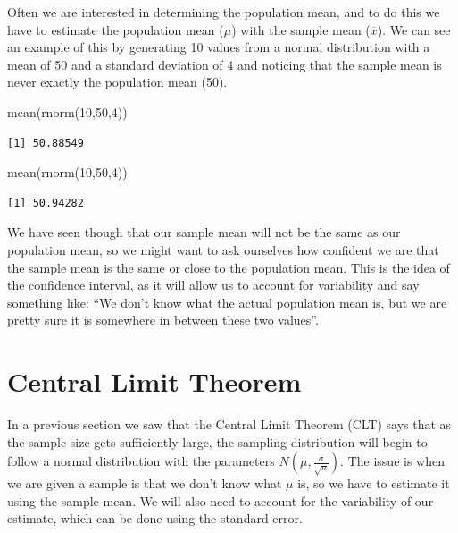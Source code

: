 \documentclass[
  letterpaper,
  DIV=11,
  numbers=noendperiod]{scrreprt}
\newenvironment{Shaded}{\begin{snugshade}}{\end{snugshade}}
\newcommand{\DecValTok}[1]{\textcolor[rgb]{0.68,0.00,0.00}{#1}}
\newcommand{\FunctionTok}[1]{\textcolor[rgb]{0.28,0.35,0.67}{#1}}
\newcommand{\NormalTok}[1]{\textcolor[rgb]{0.00,0.23,0.31}{#1}}
\begin{document}
Often we are interested in determining the population mean, and to do
this we have to estimate the population mean (\(\mu\)) with the sample
mean (\(\overline{x}\)). We can see an example of this by generating 10
values from a normal distribution with a mean of 50 and a standard
deviation of 4 and noticing that the sample mean is never exactly the
population mean (50).

\begin{Shaded}
\begin{Highlighting}[]
\FunctionTok{mean}\NormalTok{(}\FunctionTok{rnorm}\NormalTok{(}\DecValTok{10}\NormalTok{,}\DecValTok{50}\NormalTok{,}\DecValTok{4}\NormalTok{))}
\end{Highlighting}
\end{Shaded}

\begin{verbatim}
[1] 50.88549
\end{verbatim}

\begin{Shaded}
\begin{Highlighting}[]
\FunctionTok{mean}\NormalTok{(}\FunctionTok{rnorm}\NormalTok{(}\DecValTok{10}\NormalTok{,}\DecValTok{50}\NormalTok{,}\DecValTok{4}\NormalTok{))}
\end{Highlighting}
\end{Shaded}

\begin{verbatim}
[1] 50.94282
\end{verbatim}

We have seen though that our sample mean will not be the same as our
population mean, so we might want to ask ourselves how confident we are
that the sample mean is the same or close to the population mean. This
is the idea of the confidence interval, as it will allow us to account
for variability and say something like: ``We don't know what the actual
population mean is, but we are pretty sure it is somewhere in between
these two values''.

\section{Central Limit Theorem}\label{central-limit-theorem-2}

In a previous section we saw that the Central Limit Theorem (CLT) says
that as the sample size gets sufficiently large, the sampling
distribution will begin to follow a normal distribution with the
parameters \(N(\mu, \frac{\sigma}{\sqrt{n}})\). The issue is when we are
given a sample is that we don't know what \(\mu\) is, so we have to
estimate it using the sample mean. We will also need to account for the
variability of our estimate, which can be done using the standard error.
\end{document}
